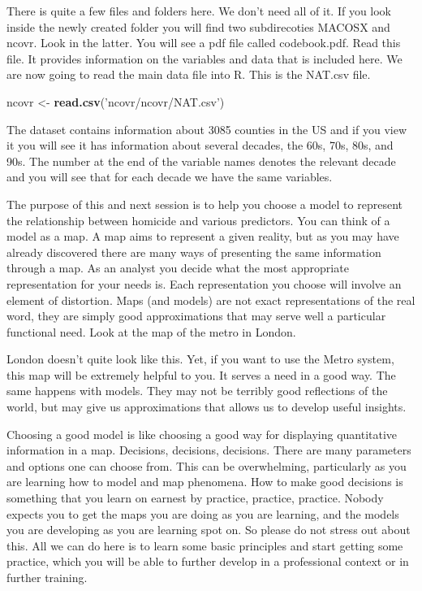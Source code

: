 \documentclass[]{book}
\newenvironment{Shaded}{\begin{snugshade}}{\end{snugshade}}
\newcommand{\KeywordTok}[1]{\textcolor[rgb]{0.13,0.29,0.53}{\textbf{#1}}}
\newcommand{\NormalTok}[1]{#1}
\newcommand{\StringTok}[1]{\textcolor[rgb]{0.31,0.60,0.02}{#1}}
\begin{document}
There is quite a few files and folders here. We don't need all of it. If you look inside the newly created folder you will find two subdirecoties MACOSX and ncovr. Look in the latter. You will see a pdf file called codebook.pdf. Read this file. It provides information on the variables and data that is included here. We are now going to read the main data file into R. This is the NAT.csv file.

\begin{Shaded}
\begin{Highlighting}[]
\NormalTok{ncovr <-}\StringTok{ }\KeywordTok{read.csv}\NormalTok{(}\StringTok{'ncovr/ncovr/NAT.csv'}\NormalTok{)}
\end{Highlighting}
\end{Shaded}

The dataset contains information about 3085 counties in the US and if you view it you will see it has information about several decades, the 60s, 70s, 80s, and 90s. The number at the end of the variable names denotes the relevant decade and you will see that for each decade we have the same variables.

The purpose of this and next session is to help you choose a model to represent the relationship between homicide and various predictors. You can think of a model as a map. A map aims to represent a given reality, but as you may have already discovered there are many ways of presenting the same information through a map. As an analyst you decide what the most appropriate representation for your needs is. Each representation you choose will involve an element of distortion. Maps (and models) are not exact representations of the real word, they are simply good approximations that may serve well a particular functional need. Look at the map of the metro in London.

London doesn't quite look like this. Yet, if you want to use the Metro system, this map will be extremely helpful to you. It serves a need in a good way. The same happens with models. They may not be terribly good reflections of the world, but may give us approximations that allows us to develop useful insights.

Choosing a good model is like choosing a good way for displaying quantitative information in a map. Decisions, decisions, decisions. There are many parameters and options one can choose from. This can be overwhelming, particularly as you are learning how to model and map phenomena. How to make good decisions is something that you learn on earnest by practice, practice, practice. Nobody expects you to get the maps you are doing as you are learning, and the models you are developing as you are learning spot on. So please do not stress out about this. All we can do here is to learn some basic principles and start getting some practice, which you will be able to further develop in a professional context or in further training.
\end{document}
